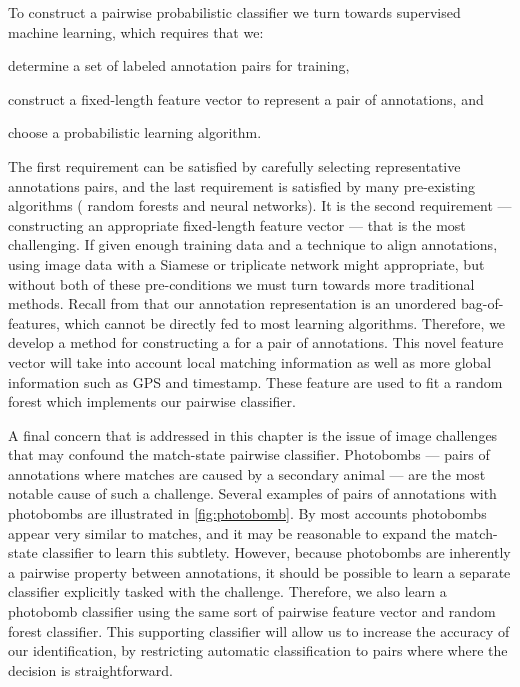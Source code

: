 To construct a pairwise probabilistic classifier we turn towards supervised
  machine learning, which requires that we:
\begin{enumerate*}[label={(\arabic*)}]

    \item determine a set of labeled annotation pairs for training, 

    \item construct a fixed-length feature vector to represent a pair of
        annotations,  and 

    \item choose a probabilistic learning algorithm.
\end{enumerate*}
The first requirement can be satisfied by carefully selecting representative
  annotations pairs, and the last requirement is satisfied by many pre-existing
  algorithms (\eg{} random forests and neural networks).
It is the second requirement --- constructing an appropriate fixed-length
  feature vector --- that is the most challenging.
If given enough training data and a technique to align annotations, using
  image data with a Siamese or triplicate network might appropriate, but without
  both of these pre-conditions we must turn towards more traditional methods.
Recall from  that our annotation representation is an
  unordered bag-of-features, which cannot be directly fed to most learning
  algorithms.
Therefore, we develop a method for constructing a  for a pair of annotations.
This novel feature vector will take into account local matching information as
  well as more global information such as GPS and timestamp.
These feature are used to fit a random forest which implements our pairwise
  classifier.


A final concern that is addressed in this chapter is the issue of image
  challenges that may confound the match-state pairwise classifier.
Photobombs --- pairs of annotations where matches are caused by a secondary
  animal --- are the most notable cause of such a challenge.
Several examples of pairs of annotations with photobombs are illustrated in
  \cref{fig:photobomb}.
By most accounts photobombs appear very similar to matches, and it may be
  reasonable to expand the match-state classifier to learn this subtlety.
However, because photobombs are inherently a pairwise property between
  annotations, it should be possible to learn a separate classifier explicitly
  tasked with the challenge.
Therefore, we also learn a photobomb classifier using the same sort of
  pairwise feature vector and random forest classifier.
This supporting classifier will allow us to increase the accuracy of our
  identification, by restricting automatic classification to pairs where where
  the decision is straightforward.


